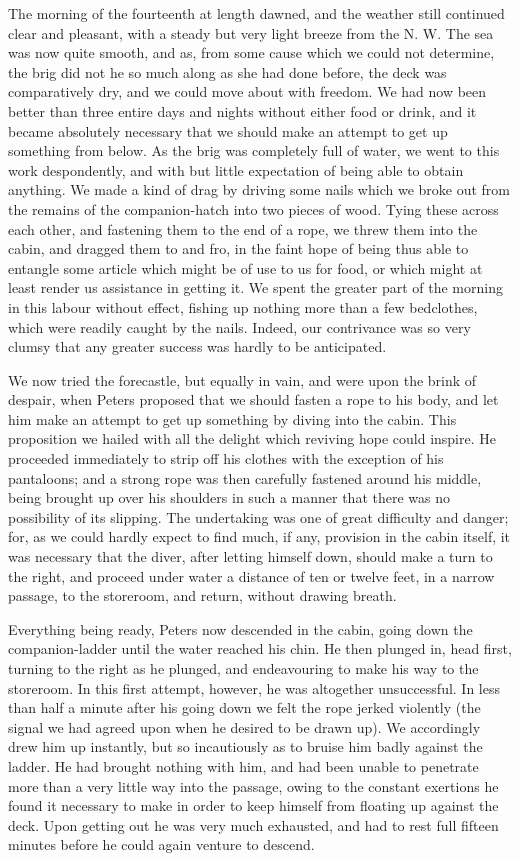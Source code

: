 The morning of the fourteenth at length dawned, and the weather still
continued clear and pleasant, with a steady but very light breeze from the N. W.
The sea was now quite smooth, and as, from some cause which we could not
determine, the brig did not he so much along as she had done before, the deck
was comparatively dry, and we could move about with freedom. We had now been
better than three entire days and nights without either food or drink, and it
became absolutely necessary that we should make an attempt to get up something
from below. As the brig was completely full of water, we went to this work
despondently, and with but little expectation of being able to obtain anything.
We made a kind of drag by driving some nails which we broke out from the remains
of the companion-hatch into two pieces of wood. Tying these across each other,
and fastening them to the end of a rope, we threw them into the cabin, and
dragged them to and fro, in the faint hope of being thus able to entangle some
article which might be of use to us for food, or which might at least render us
assistance in getting it. We spent the greater part of the morning in this
labour without effect, fishing up nothing more than a few bedclothes, which were
readily caught by the nails. Indeed, our contrivance was so very clumsy that any
greater success was hardly to be anticipated. 

We now tried the forecastle, but equally in vain, and were upon the brink of
despair, when Peters proposed that we should fasten a rope to his body, and let
him make an attempt to get up something by diving into the cabin. This
proposition we hailed with all the delight which reviving hope could inspire. He
proceeded immediately to strip off his clothes with the exception of his
pantaloons; and a strong rope was then carefully fastened around his middle,
being brought up over his shoulders in such a manner that there was no
possibility of its slipping. The undertaking was one of great difficulty and
danger; for, as we could hardly expect to find much, if any, provision in the
cabin itself, it was necessary that the diver, after letting himself down,
should make a turn to the right, and proceed under water a distance of ten or
twelve feet, in a narrow passage, to the storeroom, and return, without drawing
breath. 

Everything being ready, Peters now descended in the cabin, going down the
companion-ladder until the water reached his chin. He then plunged in, head
first, turning to the right as he plunged, and endeavouring to make his way to
the storeroom. In this first attempt, however, he was altogether unsuccessful.
In less than half a minute after his going down we felt the rope jerked
violently (the signal we had agreed upon when he desired to be drawn up). We
accordingly drew him up instantly, but so incautiously as to bruise him badly
against the ladder. He had brought nothing with him, and had been unable to
penetrate more than a very little way into the passage, owing to the constant
exertions he found it necessary to make in order to keep himself from floating
up against the deck. Upon getting out he was very much exhausted, and had to
rest full fifteen minutes before he could again venture to descend. 

